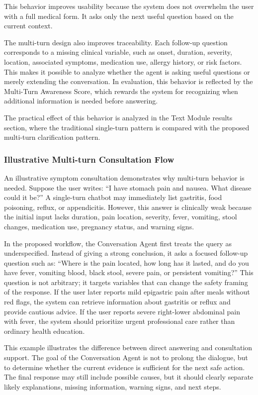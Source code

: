 This behavior improves usability because the system does not overwhelm the user with a full medical form. It asks only the next useful question based on the current context.

The multi-turn design also improves traceability. Each follow-up question corresponds to a missing clinical variable, such as onset, duration, severity, location, associated symptoms, medication use, allergy history, or risk factors. This makes it possible to analyze whether the agent is asking useful questions or merely extending the conversation. In evaluation, this behavior is reflected by the Multi-Turn Awareness Score, which rewards the system for recognizing when additional information is needed before answering.

The practical effect of this behavior is analyzed in the Text Module results section, where the traditional single-turn pattern is compared with the proposed multi-turn clarification pattern.

\subsubsection{Illustrative Multi-turn Consultation Flow}

An illustrative symptom consultation demonstrates why multi-turn behavior is needed. Suppose the user writes: ``I have stomach pain and nausea. What disease could it be?'' A single-turn chatbot may immediately list gastritis, food poisoning, reflux, or appendicitis. However, this answer is clinically weak because the initial input lacks duration, pain location, severity, fever, vomiting, stool changes, medication use, pregnancy status, and warning signs.

In the proposed workflow, the Conversation Agent first treats the query as underspecified. Instead of giving a strong conclusion, it asks a focused follow-up question such as: ``Where is the pain located, how long has it lasted, and do you have fever, vomiting blood, black stool, severe pain, or persistent vomiting?'' This question is not arbitrary; it targets variables that can change the safety framing of the response. If the user later reports mild epigastric pain after meals without red flags, the system can retrieve information about gastritis or reflux and provide cautious advice. If the user reports severe right-lower abdominal pain with fever, the system should prioritize urgent professional care rather than ordinary health education.

This example illustrates the difference between direct answering and consultation support. The goal of the Conversation Agent is not to prolong the dialogue, but to determine whether the current evidence is sufficient for the next safe action. The final response may still include possible causes, but it should clearly separate likely explanations, missing information, warning signs, and next steps.

